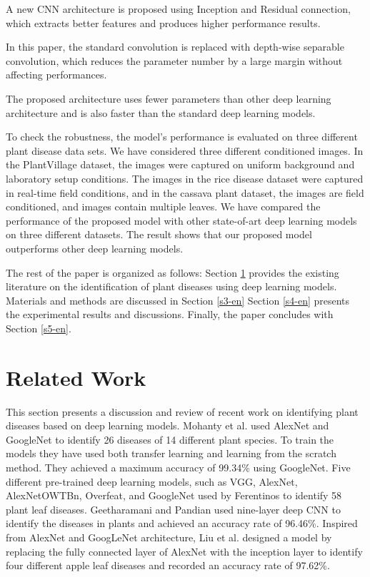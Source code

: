 A new CNN architecture is proposed using Inception and Residual connection, which extracts better features and produces higher performance results.

In this paper, the standard convolution is replaced with depth-wise separable convolution, which reduces the parameter number by a large margin without affecting performances.

The proposed architecture uses fewer parameters than other deep learning architecture and is also faster than the standard deep learning models.

To check the robustness, the model’s performance is evaluated on three different plant disease data sets. We have considered three different conditioned images. In the PlantVillage dataset, the images were captured on uniform background and laboratory setup conditions. The images in the rice disease dataset were captured in real-time field conditions, and in the cassava plant dataset, the images are field conditioned, and images contain multiple leaves. We have compared the performance of the proposed model with other state-of-art deep learning models on three different datasets. The result shows that our proposed model outperforms other deep learning models.

The rest of the paper is organized as follows: Section \ref{s2-en} provides the existing literature on the identification of plant diseases using deep learning models. Materials and methods are discussed in Section \ref{s3-en} Section \ref{s4-en} presents the experimental results and discussions. Finally, the paper concludes with Section \ref{s5-en}.

\section{Related Work} \label{s2-en}
This section presents a discussion and review of recent work on identifying plant diseases based on deep learning models. Mohanty et al.  used AlexNet and GoogleNet to identify 26 diseases of 14 different plant species. To train the models they have used both transfer learning and learning from the scratch method. They achieved a maximum accuracy of 99.34\% using GoogleNet. Five different pre-trained deep learning models, such as VGG, AlexNet, AlexNetOWTBn, Overfeat, and GoogleNet used by Ferentinos  to identify 58 plant leaf diseases. Geetharamani and Pandian  used nine-layer deep CNN to identify the diseases in plants and achieved an accuracy rate of 96.46\%. Inspired from AlexNet and GoogLeNet architecture, Liu et al.  designed a model by replacing the fully connected layer of AlexNet with the inception layer to identify four different apple leaf diseases and recorded an accuracy rate of 97.62\%.

